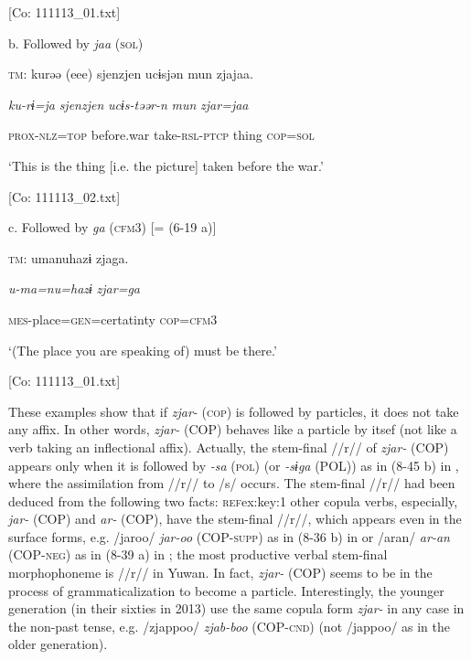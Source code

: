     [Co: 111113\_01.txt]

  b. Followed by \textit{jaa} (\textsc{sol})

  \textsc{tm}:  kurəə  (eee)  sjenzjen  ucɨsjən  mun  zjajaa.

    \textit{ku-rɨ=ja}    \textit{sjenzjen}  \textit{ucɨs-təər-n}  \textit{mun}  \textit{zjar=jaa}

    \textsc{prox}-\textsc{nlz}=\textsc{top}    before.war  take-\textsc{rsl}-\textsc{ptcp}  thing  \textsc{cop}=\textsc{sol}

    ‘This is the thing [i.e. the picture] taken before the war.’

    [Co: 111113\_02.txt]

  c. Followed by \textit{ga} (\textsc{cfm}3) [= (6-19 a)]

  \textsc{tm}:  umanuhazɨ  zjaga.

    \textit{u-ma=nu=hazɨ}  \textit{zjar=ga}

    \textsc{mes}-place=\textsc{gen}=certatinty  \textsc{cop}=\textsc{cfm}3

    ‘(The place you are speaking of) must be there.’

    [Co: 111113\_01.txt]

These examples show that if \textit{zjar-} (\textsc{cop}) is followed by particles, it does not take any affix. In other words, \textit{zjar-} (COP) behaves like a particle by itsef (not like a verb taking an inflectional affix). Actually, the stem-final //r// of \textit{zjar-} (COP) appears only when it is followed by \textit{{}-sa} (\textsc{pol}) (or \textit{{}-sɨga} (POL)) as in (8-45 b) in , where the assimilation from //r// to /s/ occurs. The stem-final //r// had been deduced from the following two facts: \textsc{ref}{ex:key:1} other copula verbs, especially, \textit{jar-} (COP) and \textit{ar-} (COP), have the stem-final //r//, which appears even in the surface forms, e.g. /jaroo/ \textit{jar-oo} (COP-\textsc{supp}) as in (8-36 b) in  or /aran/ \textit{ar-an} (COP-\textsc{neg}) as in (8-39 a) in ;  the most productive verbal stem-final morphophoneme is //r// in Yuwan. In fact, \textit{zjar-} (COP) seems to be in the process of grammaticalization to become a particle. Interestingly, the younger generation (in their sixties in 2013) use the same copula form \textit{zjar-} in any case in the non-past tense, e.g. /zjappoo/ \textit{zjab-boo} (COP-\textsc{cnd}) (not /jappoo/ as in the older generation).

